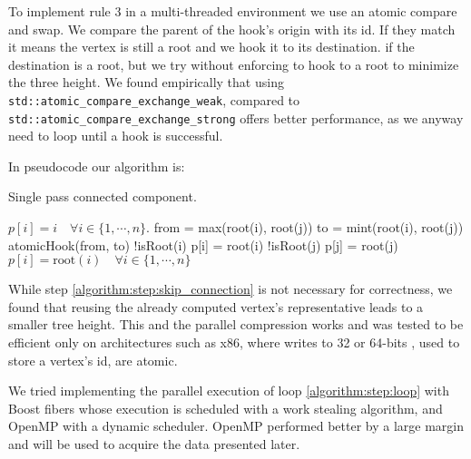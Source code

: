 To implement rule $3$ in a multi-threaded environment we use an atomic compare and swap.
We compare the parent of the hook's origin with its id. If they match it means the vertex is still a root and we
hook it to its destination.  if the destination is a root, \deleted[remark=this is really unclear]{}but we try without enforcing to
hook to a root to minimize the three height.
We found empirically that using \verb|std::atomic_compare_exchange_weak|,
compared to \verb|std::atomic_compare_exchange_strong| offers better performance, as we anyway need to loop until a hook is successful.


In pseudocode our algorithm is:

\begin{algorithm}[H]
    \caption{Single pass connected component.}
    \label{algorithm:cc2}
    \begin{algorithmic}[1]
        \State $p[i] = i \quad \forall i \in \{1,\cdots, n\}$. %
          \label{algorithm:step:loop}
                \State from = max(root(i), root(j))
                \State to = mint(root(i), root(j))
                \State  atomicHook(from, to)
        \EndWhile
        \State  \kif !isRoot(i) \kthen p[i] = root(i) \label{algorithm:step:skip_connection}
        \State  \kif !isRoot(j) \kthen p[j] = root(j)
        \EndFor
        \State $p[i] = \text{root}(i) \quad \forall i \in \{1,\cdots, n\}$ 
        \EndProcedure
    \end{algorithmic}
\end{algorithm}

While step \ref{algorithm:step:skip_connection} is not necessary for correctness, we found that
reusing the already computed vertex's representative leads to a smaller tree height. This and the parallel compression works and was tested to
be efficient only on architectures such as x86, where writes to 32 or 64-bits , used to store a vertex's id, are atomic.

We tried implementing the parallel execution of loop \ref{algorithm:step:loop} with  Boost fibers \cite{Boost}
whose execution is scheduled with a work stealing algorithm, and OpenMP with a dynamic scheduler.
OpenMP performed better by a large margin and will be used to  acquire the data presented later.

